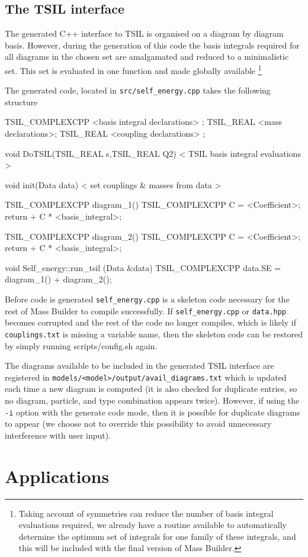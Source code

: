 \subsection{The TSIL interface}

The generated C++ interface to TSIL is organised on a diagram by diagram basis.  However, during the generation of this code the basis integrals required for all diagrams in the chosen set are amalgamated and reduced to a minimalistic set.  This set is evaluated in one function and made globally available \footnote{Taking account of symmetries can reduce the number of basis integral evaluations required, we already have a routine available to automatically determine the optimum set of integrals for one family of these integrals, and this will be included with the final version of Mass Builder.}

The generated code, located in \lstinline{src/self_energy.cpp} takes the following structure
\begin{lstcpp}
TSIL_COMPLEXCPP  <basis integral declarations> ;
TSIL_REAL  <mass declarations>;
TSIL_REAL  <coupling declarations> ;

void DoTSIL(TSIL_REAL s,TSIL_REAL Q2)
{
< TSIL basis integral evaluations >
}

void init(Data data) 
{
< set couplings & masses from data >
}

TSIL_COMPLEXCPP  diagram_1()
{
TSIL_COMPLEXCPP C =  <Coefficient>;
return  + C * <basis_integral>;
}

TSIL_COMPLEXCPP  diagram_2()
{
TSIL_COMPLEXCPP C =  <Coefficient>;
return  + C * <basis_integral>;
}

void Self_energy::run_tsil (Data &data) 
{
TSIL_COMPLEXCPP data.SE = diagram_1() + diagram_2();
}
\end{lstcpp}

Before code is generated \lstinline{self_energy.cpp} is a skeleton code necessary for the rest of Mass Builder to compile successfully.  If \lstinline{self_energy.cpp} or \lstinline{data.hpp} becomes corrupted and the rest of the code no longer compiles, which is likely if \lstinline{couplings.txt} is missing a variable name, then the skeleton code can be restored by simply running scripts/config.sh again.

The diagrams available to be included in the generated TSIL interface are registered in \lstinline{models/<model>/output/avail_diagrams.txt} which is updated each time a new diagram is computed (it is also checked for duplicate entries, so no diagram, particle, and type combination appears twice).  However, if using the \lstinline{-i} option with the generate code mode, then it is possible for duplicate diagrams to appear (we choose not to override this possibility to avoid unnecessary interference with user input).



\section{Applications}





{}


  